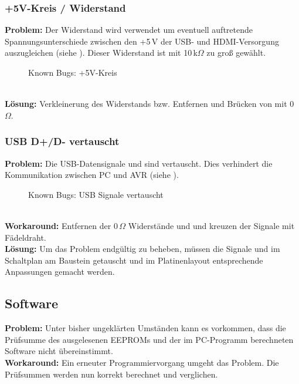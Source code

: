 \subsubsection{+5V-Kreis / Widerstand}
\textbf{Problem:} Der Widerstand  wird verwendet um eventuell auftretende Spannungsunterschiede zwischen den +5\,V der USB- und HDMI-Versorgung auszugleichen (siehe ). Dieser Widerstand ist mit 10\,k$\Omega$ zu groß gewählt.
\begin{figure}[htp]
	\center
    \caption{Known Bugs: +5V-Kreis}
    \label{fig:r13}
\end{figure}\\
\textbf{Lösung:} Verkleinerung des Widerstands bzw. Entfernen und Brücken von  mit 0\,$\Omega$.
\subsubsection{USB D+/D- vertauscht}
\textbf{Problem:} Die USB-Datensignale  und  sind vertauscht. Dies verhindert die Kommunikation zwischen PC und AVR (siehe ).
\begin{figure}[htp]
	\center
    \caption{Known Bugs: USB Signale vertauscht}
    \label{fig:usb_vertauscht}
\end{figure}\\
\textbf{Workaround:} Entfernen der 0\,$\Omega$ Widerstände  und  und kreuzen der Signale mit Fädeldraht.\\
\textbf{Lösung:} Um das Problem endgültig zu beheben, müssen die Signale  und  im Schaltplan am Baustein  getauscht und im Platinenlayout entsprechende Anpassungen gemacht werden.
\subsection{Software}
\textbf{Problem:} Unter bisher ungeklärten Umständen kann es vorkommen, dass die Prüfsumme des ausgelesenen EEPROMs und der im PC-Programm berechneten Software nicht übereinstimmt. \\
\textbf{Workaround:} Ein erneuter Programmiervorgang umgeht das Problem. Die Prüfsummen werden nun korrekt berechnet und verglichen.